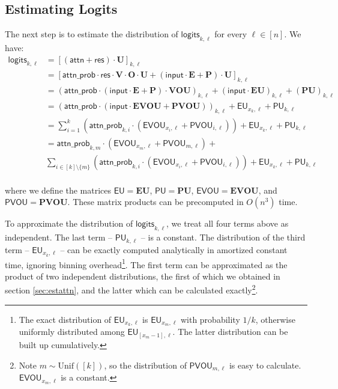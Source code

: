 \documentclass[12pt]{article}
\newcommand{\bP}{\mathbf{P}}
\newcommand{\bE}{\mathbf{E}}
\newcommand{\bV}{\mathbf{V}}
\newcommand{\bO}{\mathbf{O}}
\newcommand{\bU}{\mathbf{U}}
\newcommand{\ap}{\mathsf{attn\_prob}}
\begin{document}
\subsection{Estimating Logits} \label{sec:estlogits}

The next step is to estimate the distribution of $\mathsf{logits}_{k, \ell}$ for every $\ell \in [n]$. We have:
\begin{align*}
\mathsf{logits}_{k, \ell} &= [(\mathsf{attn} + \mathsf{res}) \cdot \bU]_{k, \ell} \\
&= [\ap \cdot \mathsf{res} \cdot \bV \cdot \bO \cdot \bU + (\mathsf{input} \cdot \bE + \bP) \cdot \bU]_{k, \ell} \\
&= (\ap \cdot (\mathsf{input} \cdot \bE + \bP) \cdot \bV \bO \bU)_{k, \ell} + (\mathsf{input} \cdot \bE \bU)_{k, \ell} + (\bP \bU)_{k, \ell} \\
&= (\ap \cdot (\mathsf{input} \cdot \bE \bV \bO \bU + \bP \bV \bO \bU))_{k, \ell} + \mathsf{EU}_{x_k, \ell} + \mathsf{PU}_{k, \ell} \\
&= \sum_{i=1}^k (\ap_{k,i} \cdot (\mathsf{EVOU}_{x_i, \ell} + \mathsf{PVOU}_{i, \ell})) + \mathsf{EU}_{x_k, \ell} + \mathsf{PU}_{k, \ell} \\
&= \ap_{k,m} \cdot (\mathsf{EVOU}_{x_m, \ell} + \mathsf{PVOU}_{m, \ell}) + \\
&\sum_{i \in [k] \setminus\{m\}} (\ap_{k,i} \cdot (\mathsf{EVOU}_{x_i, \ell} + \mathsf{PVOU}_{i, \ell})) + \mathsf{EU}_{x_k, \ell} + \mathsf{PU}_{k, \ell} \\
\end{align*}

where we define the matrices $\mathsf{EU} = \bE\bU$, $\mathsf{PU} = \bP\bU$, $\mathsf{EVOU} = \bE\bV\bO\bU$, and $\mathsf{PVOU}=\bP\bV\bO\bU$. These matrix products can be precomputed in $O(n^3)$ time.

To approximate the distribution of $\mathsf{logits}_{k,\ell}$, we treat all four terms above as independent. The last term -- $\mathsf{PU}_{k,\ell}$ -- is a constant. The distribution of the third term -- $\mathsf{EU}_{x_k, \ell}$ -- can be exactly computed analytically in amortized constant time, ignoring binning overhead\footnote{The exact distribution of $\mathsf{EU}_{x_k, \ell}$ is $\mathsf{EU}_{x_m, \ell}$ with probability $1/k$, otherwise uniformly distributed among $\mathsf{EU}_{[x_m-1],\ell}$. The latter distribution can be built up cumulatively.}. The first term can be approximated as the product of two independent distributions, the first of which we obtained in section \ref{sec:estattn}, and the latter which can be calculated exactly\footnote{Note $m\sim \mathrm{Unif}([k])$, so the distribution of $\mathsf{PVOU}_{m, \ell}$ is easy to calculate. $\mathsf{EVOU}_{x_m, \ell}$ is a constant.}.
\end{document}
